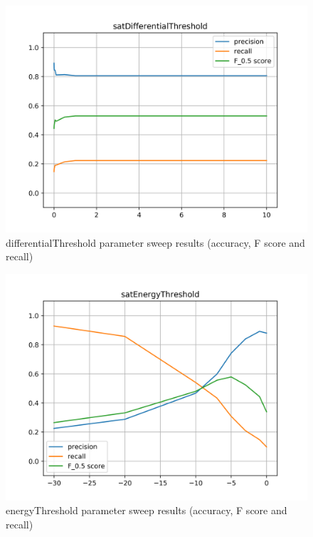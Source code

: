 \begin{figure}[!ht]
	\includegraphics[clip,width=\columnwidth]{Figures/satDifferentialThreshold.png}%
	\caption{differentialThreshold parameter sweep results (accuracy, F score and recall)}
	\label{fig:accomp}
\end{figure}

\begin{figure}[!ht]
	\includegraphics[clip,width=\columnwidth]{Figures/satEnergyThreshold.png}%
	\caption{energyThreshold parameter sweep results (accuracy, F score and recall)}
	\label{fig:accomp}
\end{figure}

